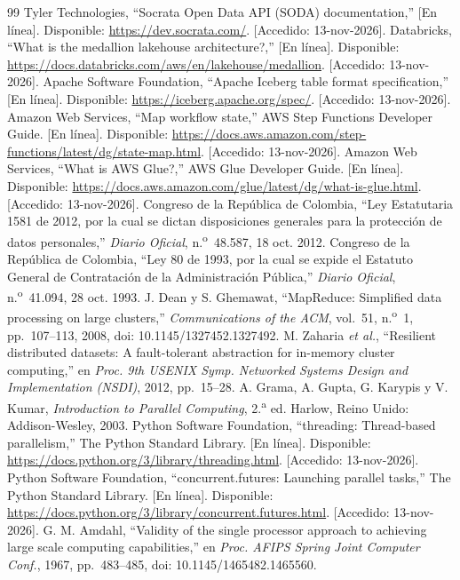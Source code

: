 \begin{thebibliography}{99}
 Tyler Technologies, ``Socrata Open Data API (SODA) documentation,'' [En línea]. Disponible: \url{https://dev.socrata.com/}. [Accedido: 13-nov-2026].
 Databricks, ``What is the medallion lakehouse architecture?,'' [En línea]. Disponible: \url{https://docs.databricks.com/aws/en/lakehouse/medallion}. [Accedido: 13-nov-2026].
 Apache Software Foundation, ``Apache Iceberg table format specification,'' [En línea]. Disponible: \url{https://iceberg.apache.org/spec/}. [Accedido: 13-nov-2026].
 Amazon Web Services, ``Map workflow state,'' AWS Step Functions Developer Guide. [En línea]. Disponible: \url{https://docs.aws.amazon.com/step-functions/latest/dg/state-map.html}. [Accedido: 13-nov-2026].
 Amazon Web Services, ``What is AWS Glue?,'' AWS Glue Developer Guide. [En línea]. Disponible: \url{https://docs.aws.amazon.com/glue/latest/dg/what-is-glue.html}. [Accedido: 13-nov-2026].
 Congreso de la República de Colombia, ``Ley Estatutaria 1581 de 2012, por la cual se dictan disposiciones generales para la protección de datos personales,'' \emph{Diario Oficial}, n.\textsuperscript{o}~48.587, 18 oct. 2012.
 Congreso de la República de Colombia, ``Ley 80 de 1993, por la cual se expide el Estatuto General de Contratación de la Administración Pública,'' \emph{Diario Oficial}, n.\textsuperscript{o}~41.094, 28 oct. 1993.
 J. Dean y S. Ghemawat, ``MapReduce: Simplified data processing on large clusters,'' \emph{Communications of the ACM}, vol.~51, n.\textsuperscript{o}~1, pp.~107--113, 2008, doi: 10.1145/1327452.1327492.
 M. Zaharia \emph{et al.}, ``Resilient distributed datasets: A fault-tolerant abstraction for in-memory cluster computing,'' en \emph{Proc. 9th USENIX Symp. Networked Systems Design and Implementation (NSDI)}, 2012, pp.~15--28.
 A. Grama, A. Gupta, G. Karypis y V. Kumar, \emph{Introduction to Parallel Computing}, 2.\textsuperscript{a} ed. Harlow, Reino Unido: Addison-Wesley, 2003.
 Python Software Foundation, ``threading: Thread-based parallelism,'' The Python Standard Library. [En línea]. Disponible: \url{https://docs.python.org/3/library/threading.html}. [Accedido: 13-nov-2026].
 Python Software Foundation, ``concurrent.futures: Launching parallel tasks,'' The Python Standard Library. [En línea]. Disponible: \url{https://docs.python.org/3/library/concurrent.futures.html}. [Accedido: 13-nov-2026].
 G. M. Amdahl, ``Validity of the single processor approach to achieving large scale computing capabilities,'' en \emph{Proc. AFIPS Spring Joint Computer Conf.}, 1967, pp.~483--485, doi: 10.1145/1465482.1465560.

\end{thebibliography}
